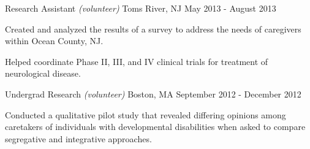 \begin{cventries}
    {Research Assistant \textnormal{\small{\textit{(volunteer)}}}}
    {Toms River, NJ}
    {May 2013 - August 2013}
    {\begin{cvitems}
        \item{Created and analyzed the results of a 
            {survey} to address the needs of caregivers within Ocean County,
            NJ.\vspace*{0.1cm}}
        \item{Helped coordinate Phase II, III, and IV clinical trials for treatment of
            neurological disease.}
    \end{cvitems}}
    \vspace*{0.2cm}
    
    {Undergrad Research \textnormal{\small{\textit{(volunteer)}}}}
    {Boston, MA}
    {September 2012 - December 2012}
    {\begin{cvitems}
        \item{Conducted a qualitative 
            {pilot study} that revealed differing opinions among caretakers of
            individuals with developmental disabilities when asked to compare
            segregative and integrative approaches.}
    \end{cvitems}}

\vspace*{-0.2cm}
\end{cventries}
